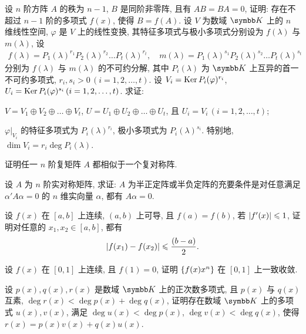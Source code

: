 \begin{exercise}[series=exer]
    \item 设 $ n $ 阶方阵 $ A $ 的秩为 $ n-1 $, $ B $ 是同阶非零阵, 且有 $ AB = BA = 0 $, 证明: 存在不超过 $ n-1 $ 阶的多项式 $ f(x) $, 使得 $ B = f(A) $.
    \sitem 设 $ V $ 为数域 $ \K $ 上的 $ n $ 维线性空间, $ \varphi $ 是 $ V $ 上的线性变换, 其特征多项式与极小多项式分别设为 $ f(\lambda) $ 与 $ m(\lambda) $, 设
    \begin{align*}
        f(\lambda) = P_{1}(\lambda)^{r_{1}}P_{2}(\lambda)^{r_{2}}\dots P_{t}(\lambda)^{r_{t}}, \quad m(\lambda) = P_{1}(\lambda)^{s_{1}}P_{2}(\lambda)^{s_{2}}\dots P_{t}(\lambda)^{s_{t}}
    \end{align*}
    分别为 $ f(\lambda) $ 与 $ m(\lambda) $ 的不可约分解, 其中 $ P_{i}(\lambda) $ 为 $ \K $ 上互异的首一不可约多项式, $ r_{i}, s_{i} > 0\, (i = 1, 2, \dots, t) $. 设 $ V_{i} = \operatorname{Ker} P_{i}(\varphi)^{r_{i}} $, $ U_{i} = \operatorname{Ker} P_{i}(\varphi)^{s_{i}}\,(i = 1, 2, \dots, t) $. 求证:
    \begin{exercise}
        \item $ V = V_{1} \oplus V_{2} \oplus \dots \oplus V_{t} $, $ U = U_{1} \oplus U_{2} \oplus \dots \oplus U_{t} $, 且 $ U_{i} = V_{i}\,(i = 1, 2, \dots, t) $;
        \item $ \varphi|_{V_{i}} $ 的特征多项式为 $ P_{i}(\lambda)^{r_{i}} $, 极小多项式为 $ P_{i}(\lambda)^{s_{i}} $. 特别地, $ \dim V_{i} = r_{i}\deg P_{i}(\lambda) $. 
    \end{exercise}
    \item 证明任一 $ n $ 阶复矩阵 $ A $ 都相似于一个复对称阵.
    \item 设 $ A $ 为 $ n $ 阶实对称矩阵, 求证: $ A $ 为半正定阵或半负定阵的充要条件是对任意满足 $ \alpha' A\alpha = 0 $ 的 $ n $ 维实向量 $ \alpha $, 都有 $ A\alpha = 0 $.
    \item 设 $ f(x) $ 在 $ [a, b] $ 上连续, $ (a, b) $ 上可导, 且 $ f(a) = f(b) $, 若 $ \abs{f'(x)} \leqslant 1 $, 证明对任意的 $ x_{1}, x_{2} \in [a, b] $, 都有
    \begin{align*}
        \abs{f(x_{1}) - f(x_{2})} \leqslant \frac{(b - a)}{2}.
    \end{align*}
    \item 设 $ f(x) $ 在 $ [0, 1] $ 上连续, 且 $ f(1) = 0 $, 证明 $ \qty{f(x)x^{n}} $ 在 $ [0, 1] $ 上一致收敛.
    \item 设 $ p(x), q(x), r(x) $ 是数域 $ \K $ 上的正次数多项式, 且 $ p(x) $ 与 $ q(x) $ 互素, $ \deg r(x) < \deg p(x) + \deg q(x) $, 证明存在数域 $ \K $ 上的多项式 $ u(x), v(x) $, 满足 $ \deg u(x) < \deg p(x) $, $ \deg v(x) < \deg q(x) $, 使得 $ r(x) = p(x)v(x) + q(x)u(x) $.

\end{exercise}
